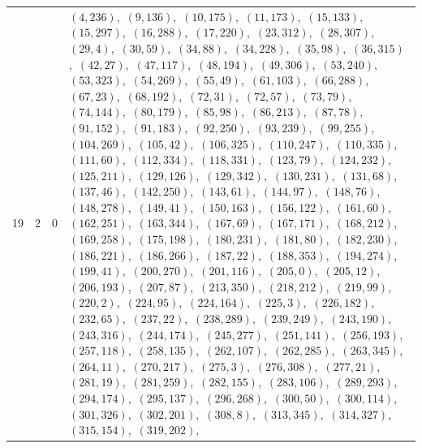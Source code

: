 \documentclass[11pt]{article}
\begin{document}
\begin{longtable}{@{}rrl>{\raggedright\arraybackslash}p{}@{}}
19 & 2 & $0$ & $(4,236)$,\allowbreak\ $(9,136)$,\allowbreak\ $(10,175)$,\allowbreak\ $(11,173)$,\allowbreak\ $(15,133)$,\allowbreak\ $(15,297)$,\allowbreak\ $(16,288)$,\allowbreak\ $(17,220)$,\allowbreak\ $(23,312)$,\allowbreak\ $(28,307)$,\allowbreak\ $(29,4)$,\allowbreak\ $(30,59)$,\allowbreak\ $(34,88)$,\allowbreak\ $(34,228)$,\allowbreak\ $(35,98)$,\allowbreak\ $(36,315)$,\allowbreak\ $(42,27)$,\allowbreak\ $(47,117)$,\allowbreak\ $(48,194)$,\allowbreak\ $(49,306)$,\allowbreak\ $(53,240)$,\allowbreak\ $(53,323)$,\allowbreak\ $(54,269)$,\allowbreak\ $(55,49)$,\allowbreak\ $(61,103)$,\allowbreak\ $(66,288)$,\allowbreak\ $(67,23)$,\allowbreak\ $(68,192)$,\allowbreak\ $(72,31)$,\allowbreak\ $(72,57)$,\allowbreak\ $(73,79)$,\allowbreak\ $(74,144)$,\allowbreak\ $(80,179)$,\allowbreak\ $(85,98)$,\allowbreak\ $(86,213)$,\allowbreak\ $(87,78)$,\allowbreak\ $(91,152)$,\allowbreak\ $(91,183)$,\allowbreak\ $(92,250)$,\allowbreak\ $(93,239)$,\allowbreak\ $(99,255)$,\allowbreak\ $(104,269)$,\allowbreak\ $(105,42)$,\allowbreak\ $(106,325)$,\allowbreak\ $(110,247)$,\allowbreak\ $(110,335)$,\allowbreak\ $(111,60)$,\allowbreak\ $(112,334)$,\allowbreak\ $(118,331)$,\allowbreak\ $(123,79)$,\allowbreak\ $(124,232)$,\allowbreak\ $(125,211)$,\allowbreak\ $(129,126)$,\allowbreak\ $(129,342)$,\allowbreak\ $(130,231)$,\allowbreak\ $(131,68)$,\allowbreak\ $(137,46)$,\allowbreak\ $(142,250)$,\allowbreak\ $(143,61)$,\allowbreak\ $(144,97)$,\allowbreak\ $(148,76)$,\allowbreak\ $(148,278)$,\allowbreak\ $(149,41)$,\allowbreak\ $(150,163)$,\allowbreak\ $(156,122)$,\allowbreak\ $(161,60)$,\allowbreak\ $(162,251)$,\allowbreak\ $(163,344)$,\allowbreak\ $(167,69)$,\allowbreak\ $(167,171)$,\allowbreak\ $(168,212)$,\allowbreak\ $(169,258)$,\allowbreak\ $(175,198)$,\allowbreak\ $(180,231)$,\allowbreak\ $(181,80)$,\allowbreak\ $(182,230)$,\allowbreak\ $(186,221)$,\allowbreak\ $(186,266)$,\allowbreak\ $(187,22)$,\allowbreak\ $(188,353)$,\allowbreak\ $(194,274)$,\allowbreak\ $(199,41)$,\allowbreak\ $(200,270)$,\allowbreak\ $(201,116)$,\allowbreak\ $(205,0)$,\allowbreak\ $(205,12)$,\allowbreak\ $(206,193)$,\allowbreak\ $(207,87)$,\allowbreak\ $(213,350)$,\allowbreak\ $(218,212)$,\allowbreak\ $(219,99)$,\allowbreak\ $(220,2)$,\allowbreak\ $(224,95)$,\allowbreak\ $(224,164)$,\allowbreak\ $(225,3)$,\allowbreak\ $(226,182)$,\allowbreak\ $(232,65)$,\allowbreak\ $(237,22)$,\allowbreak\ $(238,289)$,\allowbreak\ $(239,249)$,\allowbreak\ $(243,190)$,\allowbreak\ $(243,316)$,\allowbreak\ $(244,174)$,\allowbreak\ $(245,277)$,\allowbreak\ $(251,141)$,\allowbreak\ $(256,193)$,\allowbreak\ $(257,118)$,\allowbreak\ $(258,135)$,\allowbreak\ $(262,107)$,\allowbreak\ $(262,285)$,\allowbreak\ $(263,345)$,\allowbreak\ $(264,11)$,\allowbreak\ $(270,217)$,\allowbreak\ $(275,3)$,\allowbreak\ $(276,308)$,\allowbreak\ $(277,21)$,\allowbreak\ $(281,19)$,\allowbreak\ $(281,259)$,\allowbreak\ $(282,155)$,\allowbreak\ $(283,106)$,\allowbreak\ $(289,293)$,\allowbreak\ $(294,174)$,\allowbreak\ $(295,137)$,\allowbreak\ $(296,268)$,\allowbreak\ $(300,50)$,\allowbreak\ $(300,114)$,\allowbreak\ $(301,326)$,\allowbreak\ $(302,201)$,\allowbreak\ $(308,8)$,\allowbreak\ $(313,345)$,\allowbreak\ $(314,327)$,\allowbreak\ $(315,154)$,\allowbreak\ $(319,202)$,\allowbreak\ 
\end{longtable}
\end{document}
